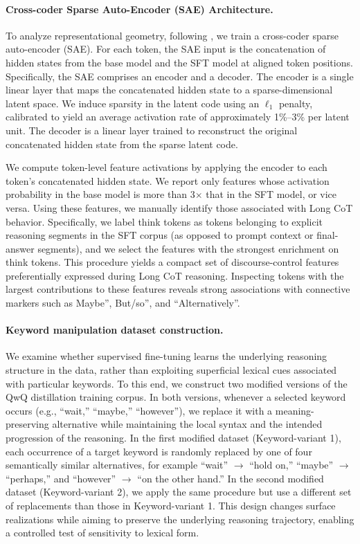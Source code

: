 \paragraph{\textbf{Cross-coder Sparse Auto-Encoder (SAE) Architecture.}}
\label{app:sft-sae-arch}
To analyze representational geometry, following \citet{jiralerspong2025model,lindsey2025sparse}, we train a cross-coder sparse auto-encoder (SAE). For each token, the SAE input is the concatenation of hidden states from the base model and the SFT model at aligned token positions.
Specifically, the SAE comprises an encoder and a decoder. The encoder is a single linear layer that maps the concatenated hidden state to a sparse-dimensional latent space. We induce sparsity in the latent code using an $\ell_1$ penalty, calibrated to yield an average activation rate of approximately 1\%–3\% per latent unit. The decoder is a linear layer trained to reconstruct the original concatenated hidden state from the sparse latent code.

We compute token-level feature activations by applying the encoder to each token’s concatenated hidden state. We report only features whose activation probability in the base model is more than 3$\times$ that in the SFT model, or vice versa. Using these features, we manually identify those associated with Long CoT behavior. Specifically, we label {think tokens} as tokens belonging to explicit reasoning segments in the SFT corpus (as opposed to prompt context or final-answer segments), and we select the features with the strongest enrichment on think tokens. This procedure yields a compact set of discourse-control features preferentially expressed during Long CoT reasoning. Inspecting tokens with the largest contributions to these features reveals strong associations with connective markers such as Maybe'', But/so'', and ``Alternatively''.\vspace{-5pt}


\paragraph{\textbf{Keyword manipulation dataset construction.}}
\label{app:sft-sae-keyword}
We examine whether supervised fine-tuning learns the underlying reasoning structure in the data, rather than exploiting superficial lexical cues associated with particular keywords. To this end, we construct two modified versions of the QwQ distillation training corpus. In both versions, whenever a selected keyword occurs (e.g., “wait,” “maybe,” “however”), we replace it with a meaning-preserving alternative while maintaining the local syntax and the intended progression of the reasoning.
In the first modified dataset (Keyword-variant 1), each occurrence of a target keyword is randomly replaced by one of four semantically similar alternatives, for example “wait” $\rightarrow$ “hold on,” “maybe” $\rightarrow$ “perhaps,” and “however” $\rightarrow$ “on the other hand.” In the second modified dataset (Keyword-variant 2), we apply the same procedure but use a different set of replacements than those in Keyword-variant 1. This design changes surface realizations while aiming to preserve the underlying reasoning trajectory, enabling a controlled test of sensitivity to lexical form.

